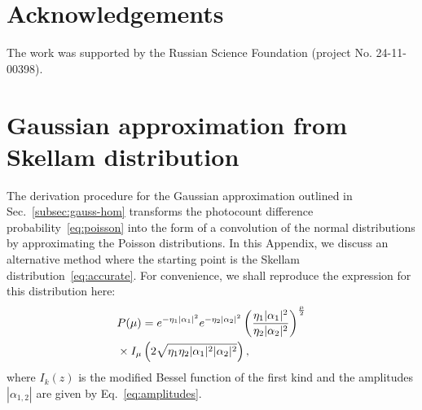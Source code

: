 \documentclass[%
reprint,
superscriptaddress,
 amsmath,amssymb,amsfonts,
 aps,
 pra,
 longbibliography
]{revtex4-2}
\begin{document}








\section*{Acknowledgements}
The work was supported by the Russian Science Foundation (project No. 24-11-00398).

\appendix

\section{Gaussian approximation from Skellam distribution}
\label{sec:appendix}



The derivation procedure for the Gaussian approximation
outlined in Sec.~\ref{subsec:gauss-hom}
transforms
the photocount difference probability~\eqref{eq:poisson}
into the form of a convolution of the normal distributions
by approximating the Poisson distributions.
In this Appendix,
we discuss an alternative method
where the starting point is the Skellam distribution~\eqref{eq:accurate}.
For convenience, we shall reproduce the expression for
this distribution here:
\begin{align}
  &
\label{eq:Skellam}   
  P(\mu)=e^{-\eta_1|\alpha_1|^2}e^{-\eta_2|\alpha_2|^2}
  \left(\frac{\eta_1|\alpha_1|^2}{\eta_2|\alpha_2|^2}\right)^{\frac{\mu}{2}}
  \notag
  \\
  &
  \times
I_{\mu}\left(2\sqrt{\eta_1\eta_2|\alpha_1|^2|\alpha_2|^2}\right),
\end{align}
where $I_k(z)$ is the modified Bessel function of the first kind
and the amplitudes $|\alpha_{1,2}|$ are given by Eq.~\eqref{eq:amplitudes}.
\end{document}
